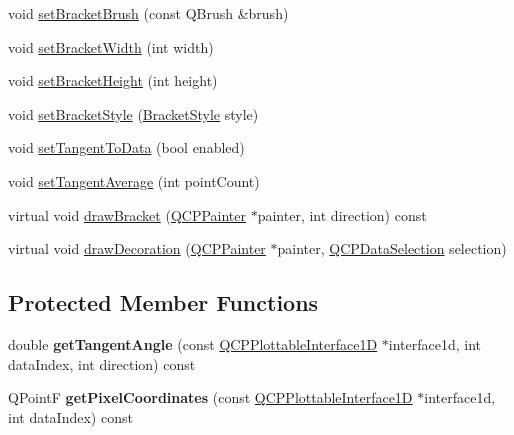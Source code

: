 \begin{DoxyCompactItemize}
void \mbox{\hyperlink{class_q_c_p_selection_decorator_bracket_a2f4ea0bfb0ea980252b76dd349dd53aa}{set\+Bracket\+Brush}} (const Q\+Brush \&brush)
\item 
void \mbox{\hyperlink{class_q_c_p_selection_decorator_bracket_a291b59cab98ce93a0a3c85963fe10f5e}{set\+Bracket\+Width}} (int width)
\item 
void \mbox{\hyperlink{class_q_c_p_selection_decorator_bracket_aed773ad737201cca40efc6fe451acad8}{set\+Bracket\+Height}} (int height)
\item 
void \mbox{\hyperlink{class_q_c_p_selection_decorator_bracket_a04507697438f6ad8cc2aeea5422dcbe5}{set\+Bracket\+Style}} (\mbox{\hyperlink{class_q_c_p_selection_decorator_bracket_aa6d18517ec0553575bbef0de4252336e}{Bracket\+Style}} style)
\item 
void \mbox{\hyperlink{class_q_c_p_selection_decorator_bracket_a93bc6086e53a5e40a08641a7b2e2cdd5}{set\+Tangent\+To\+Data}} (bool enabled)
\item 
void \mbox{\hyperlink{class_q_c_p_selection_decorator_bracket_adb2d0876f25a77c88042b70818f1d6e4}{set\+Tangent\+Average}} (int point\+Count)
\item 
virtual void \mbox{\hyperlink{class_q_c_p_selection_decorator_bracket_a57b65b5508d5bd0f27c9318f3d4646be}{draw\+Bracket}} (\mbox{\hyperlink{class_q_c_p_painter}{Q\+C\+P\+Painter}} $\ast$painter, int direction) const
\item 
virtual void \mbox{\hyperlink{class_q_c_p_selection_decorator_bracket_a1ceb893063ea3d7197a24098018f4bfb}{draw\+Decoration}} (\mbox{\hyperlink{class_q_c_p_painter}{Q\+C\+P\+Painter}} $\ast$painter, \mbox{\hyperlink{class_q_c_p_data_selection}{Q\+C\+P\+Data\+Selection}} selection)
\end{DoxyCompactItemize}
\subsection*{Protected Member Functions}
\begin{DoxyCompactItemize}
\item 
\mbox{\label{class_q_c_p_selection_decorator_bracket_ac002e20586950bf5c91a399863769c61}} 
double {\bfseries get\+Tangent\+Angle} (const \mbox{\hyperlink{class_q_c_p_plottable_interface1_d}{Q\+C\+P\+Plottable\+Interface1D}} $\ast$interface1d, int data\+Index, int direction) const
\item 
\mbox{\label{class_q_c_p_selection_decorator_bracket_a9925ed667e8a645fcb9949bd02ee4a19}} 
Q\+PointF {\bfseries get\+Pixel\+Coordinates} (const \mbox{\hyperlink{class_q_c_p_plottable_interface1_d}{Q\+C\+P\+Plottable\+Interface1D}} $\ast$interface1d, int data\+Index) const
\end{DoxyCompactItemize}
